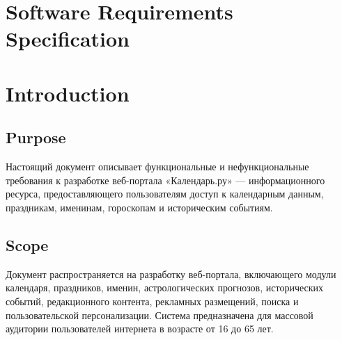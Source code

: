
\section*{Software Requirements Specification}

\section{Introduction}

\subsection{Purpose}
Настоящий документ описывает функциональные и нефункциональные требования
к разработке веб-портала «Календарь.ру» — информационного ресурса,
предоставляющего пользователям доступ к календарным данным, праздникам,
именинам, гороскопам и историческим событиям.

\subsection{Scope}
Документ распространяется на разработку веб-портала,
включающего модули календаря, праздников, именин, астрологических прогнозов,
исторических событий, редакционного контента, рекламных размещений, поиска
и пользовательской персонализации. Система
предназначена для массовой аудитории пользователей интернета в возрасте
от 16 до 65 лет.

